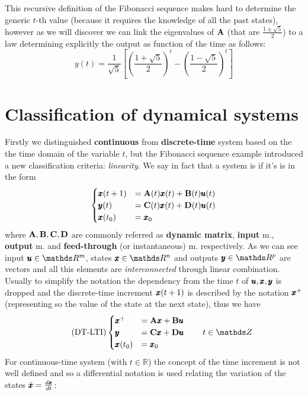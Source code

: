 	This recursive definition of the Fibonacci sequence makes hard to determine the generic $t$-th value (because it requires the knowledge of all the past states), however as we will discover we can link the eigenvalues of $\mathbf{A}$ (that are $\frac{1\pm \sqrt 5}{2}$) to a law determining explicitly the output as function of the time as follows:
	\[ y(t) = \frac 1 {\sqrt 5} \left[ \left(\frac{1+\sqrt 5}{2}\right)^t - \left(\frac{1-\sqrt 5}{2}\right)^t \right] \]

\section{Classification of dynamical systems}
	Firstly we distinguished \textbf{continuous} from \textbf{discrete-time} system based on the the time domain of the variable $t$, but the Fibonacci sequence example introduced a new classification criteria: \textit{linearity}. We say in fact that a system is  if it's  is in the form
	\begin{equation}
	\begin{cases}
		\pmb{x}(t+1) & = \mathbf{A}(t)\pmb{x}(t) + \mathbf{B}(t) \pmb{u}(t) \\
		\pmb{y}(t)& = \mathbf{C}(t) \pmb{x}(t) + \mathbf{D}(t) \pmb{u}(t) \\
		\pmb{x}(t_0) & = \pmb{x}_0
	\end{cases} 
	\end{equation}
	where $\mathbf{A}, \mathbf{B}, \mathbf{C}, \mathbf{D}$ are commonly referred as \textbf{dynamic matrix}, \textbf{input} m., \textbf{output} m. and \textbf{feed-through} (or instantaneous) m. respectively. As we can see input $\u \in \mathds R^m$, states $\x \in \mathds R^n$ and outputs $\y\in \mathds R^p$ are vectors and all this elements are \textit{interconnected} through linear combination. Usually to simplify the notation the dependency from the time $t$ of $\pmb{u},\pmb{x},\pmb{y}$ is dropped and the discrete-time increment $\pmb{x}(t+1)$ is described by the notation $\pmb{x}^+$ (representing so the value of the state at the next state), thus we have
	\begin{equation} \tag{DT-LTI} \label{DTLTI}
	\begin{cases}
		\xp & = \A \x + \B \u \\ \y & = \C \x + \D \u \\ \x(t_0) & = \x_0 
	\end{cases} \qquad t\in \mathds Z
	\end{equation}
	For continuous-time system (with $t\in \mathds R$) the concept of the time increment is not well defined and so a differential notation is used relating the variation of the states $\dot{\pmb{x}} = \frac{d\pmb{x}}{dt}$:
